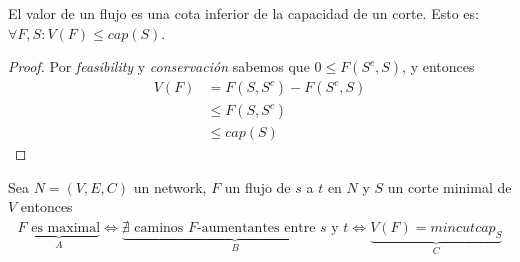 \begin{corollary}
  El valor de un flujo es una cota inferior de la capacidad de un corte.
  Esto es: $\forall F, S \colon V(F) \le cap(S)$.
\end{corollary}

\begin{proof}
  Por \emph{feasibility} y \emph{conservación} sabemos que
  $0 \le F(S^c, S)$, y entonces
  \begin{align}
    V(F)
    &= F(S, S^c) - F(S^c, S)\\
	  &\le F(S, S^c)\\
    &\le cap(S)
  \end{align}
\end{proof}

\begin{theorem}
  Sea $N = (V,E,C)$ un network, $F$ un flujo de $s$ a $t$ en $N$ y $S$ un corte minimal de $V$ entonces
  \begin{align}
    \underbrace{F \text{ es maximal}}_{A} \iff 
    \underbrace{\nexists \text{ caminos } F\text{-aumentantes entre $s$ y $t$}}_{B} \iff
    \underbrace{V(F) = mincutcap_S}_{C}
  \end{align}
\end{theorem}
